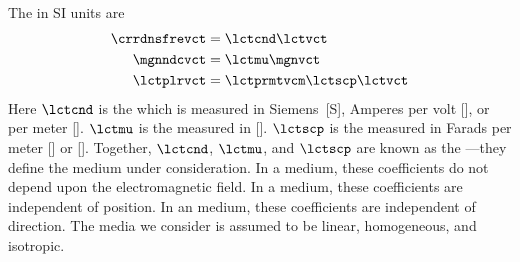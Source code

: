\documentclass[12pt]{article}
\begin{document}
The  in SI units are
\cite[][p.~13]{BoH83} 
\begin{subequations}
\label{eqn:cns_eqn_SI}
\begin{align}
\label{eqn:cns_eqn_SI_crr_dns}
\crrdnsfrevct & = \lctcnd \lctvct \\
\label{eqn:cns_eqn_SI_mgn_ndc}
\mgnndcvct & = \lctmu \mgnvct \\
\label{eqn:cns_eqn_SI_plr}
\lctplrvct & = \lctprmtvcm \lctscp \lctvct
\end{align}
\end{subequations} 
Here $\lctcnd$ is the  which is 
measured in Siemens~[S], Amperes per volt [\axv], or  per
meter [\mhoxm].  
$\lctmu$ is the  measured in [\hxm]. 
$\lctscp$ is the  measured in Farads
per meter [\fxm] or [\cxvm].
Together, $\lctcnd$, $\lctmu$, and $\lctscp$ are known as the 
---they define the medium under 
consideration. 
In a  medium, these coefficients do not depend upon
the electromagnetic field.
In a  medium, these coefficients are independent
of position.
In an  medium, these coefficients are independent
of direction.
The media we consider is assumed to be linear, homogeneous, and
isotropic. 
\end{document}
